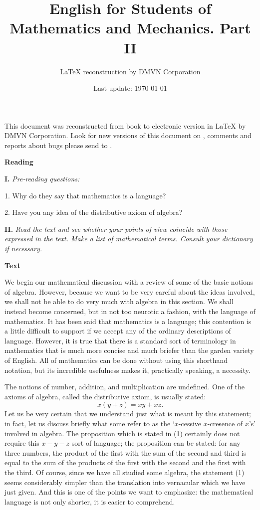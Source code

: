 \documentclass[a4paper]{article}
\title{English for Students of Mathematics and Mechanics. Part II}
\author{\LaTeX{} reconstruction by DMVN Corporation}
\date{Last update: \today}
\newcounter{EUnits}
\newcommand{\EUnit}{\par\medskip{\huge \textbf{Unit \arabic{EUnits}}}\par\stepcounter{EUnits}}
\newcommand{\ESect}[1]{\medskip\par{\large \textbf{#1}}\par}
\newcommand{\ETask}[2]{\medskip\par\textbf{#1.} \textit{#2}\par}
\newcommand{\Eqn}[1]{\begin{equation}#1\end{equation}}
\begin{document}
\maketitle

This document was reconstructed from book to electronic version in \LaTeX{} by DMVN Corporation.
Look for new versions of this document on \dmvnwebsite{}, comments and reports about bugs
please send to \dmvnmail{}.

\EUnit
\ESect{Reading}
\ETask{I}{Pre-reading questions:}
1. Why do they say that mathematics is a language?

2. Have you any idea of the distributive axiom of algebra?

\ETask{II}{Read the text and see whether your points of view coincide with those expressed in the text. Make a list of mathematical terms. Consult your dictionary if necessary.}
\ESect{Text}
We begin our mathematical discussion with a review of some of the basic notions of algebra. However, because we want to be
very careful about the ideas involved, we shall not be able to do very much with algebra in this section. We shall instead
become concerned, but in not too neurotic a fashion, with the language of mathematics. It has been said that mathematics is
a language; this contention is a little difficult to support if we accept any of the ordinary descriptions of language. However,
it is true that there is a standard sort of terminology in mathematics that is much more concise and much briefer than the
garden variety of English. All of mathematics can be done without using this shorthand notation, but its incredible usefulness
makes it, practically speaking, a necessity.

The notions of number, addition, and multiplication are undefined. One of the axioms of algebra, called the distributive axiom,
is usually stated: \Eqn {x(y+z)=xy+xz.}
Let us be very certain that we understand just what is meant by this statement; in fact, let us discuss briefly what some refer
to as the `$x$-cessive $x$-cresence of $x$'s' involved in algebra. The proposition which is stated in (1) certainly does not
require this $x-y-z$ sort of language; the proposition can be stated: for any three numbers, the product of the first with
the sum of the second and third is equal to the sum of the products of the first with the second and the first with the third.
Of course, since we have all studied some algebra, the statement (1) seems considerably simpler than the translation into
vernacular which we have just given. And this is one of the points we want to emphasize: the mathematical language is not only
shorter, it is easier to comprehend.
\end{document}

